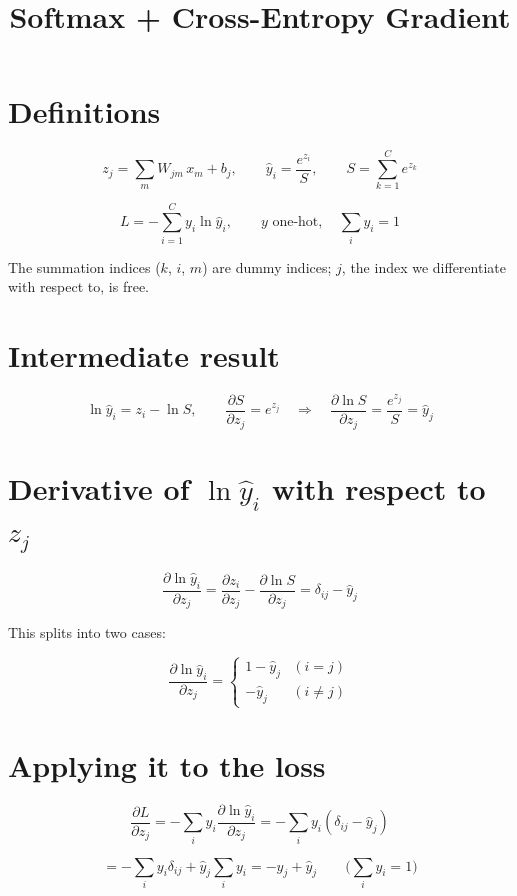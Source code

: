 \documentclass[11pt]{article}
\title{Softmax + Cross-Entropy Gradient}
\author{}
\date{}
\begin{document}
\maketitle

\section*{Definitions}

\[
z_j = \sum_{m} W_{jm}\,x_m + b_j, \qquad
\hat{y}_i = \frac{e^{z_i}}{S}, \qquad
S = \sum_{k=1}^{C} e^{z_k}
\]

\[
L = -\sum_{i=1}^{C} y_i \ln \hat{y}_i, \qquad
y \text{ one-hot}, \quad \sum_i y_i = 1
\]

The summation indices ($k$, $i$, $m$) are dummy indices; $j$, the index we differentiate with respect to, is free.

\section*{Intermediate result}

\[
\ln \hat{y}_i = z_i - \ln S, \qquad
\frac{\partial S}{\partial z_j} = e^{z_j}
\quad\Longrightarrow\quad
\frac{\partial \ln S}{\partial z_j} = \frac{e^{z_j}}{S} = \hat{y}_j
\]

\section*{Derivative of $\ln \hat{y}_i$ with respect to $z_j$}

\[
\frac{\partial \ln \hat{y}_i}{\partial z_j}
= \frac{\partial z_i}{\partial z_j} - \frac{\partial \ln S}{\partial z_j}
= \delta_{ij} - \hat{y}_j
\]

This splits into two cases:

\[
\frac{\partial \ln \hat{y}_i}{\partial z_j} =
\begin{cases}
1 - \hat{y}_j & (i = j) \\
-\hat{y}_j & (i \neq j)
\end{cases}
\]

\section*{Applying it to the loss}

\[
\frac{\partial L}{\partial z_j}
= -\sum_i y_i \frac{\partial \ln \hat{y}_i}{\partial z_j}
= -\sum_i y_i \left(\delta_{ij} - \hat{y}_j\right)
\]

\[
= -\sum_i y_i \delta_{ij} + \hat{y}_j \sum_i y_i
= -y_j + \hat{y}_j \qquad \Big(\textstyle\sum_i y_i = 1\Big)
\]
\end{document}
